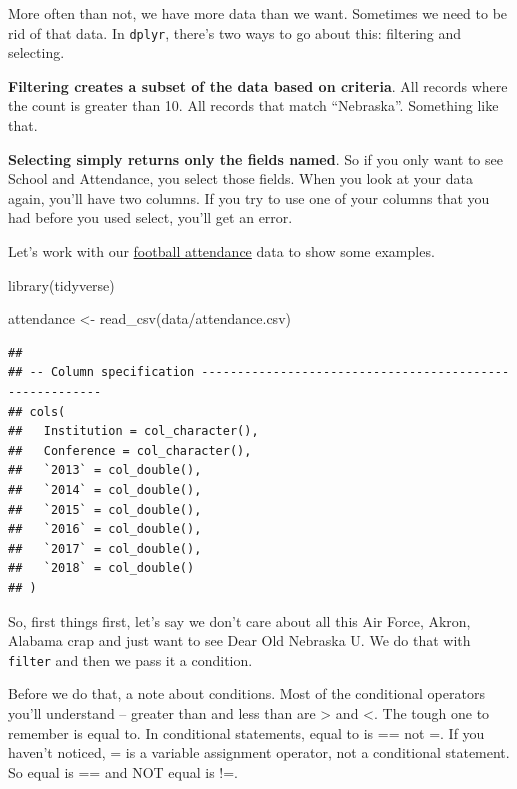 \documentclass[
]{book}
\newenvironment{Shaded}{\begin{snugshade}}{\end{snugshade}}
\newcommand{\FunctionTok}[1]{\textcolor[rgb]{0.00,0.00,0.00}{#1}}
\newcommand{\NormalTok}[1]{#1}
\newcommand{\OtherTok}[1]{\textcolor[rgb]{0.56,0.35,0.01}{#1}}
\newcommand{\StringTok}[1]{\textcolor[rgb]{0.31,0.60,0.02}{#1}}
\begin{document}
More often than not, we have more data than we want. Sometimes we need to be rid of that data. In \texttt{dplyr}, there's two ways to go about this: filtering and selecting.

\textbf{Filtering creates a subset of the data based on criteria}. All records where the count is greater than 10. All records that match ``Nebraska''. Something like that.

\textbf{Selecting simply returns only the fields named}. So if you only want to see School and Attendance, you select those fields. When you look at your data again, you'll have two columns. If you try to use one of your columns that you had before you used select, you'll get an error.

Let's work with our \href{https://unl.box.com/s/oajabnn5614s22jstgcd9ojxo2njn6jt}{football attendance} data to show some examples.

\begin{Shaded}
\begin{Highlighting}[]
\FunctionTok{library}\NormalTok{(tidyverse)}
\end{Highlighting}
\end{Shaded}

\begin{Shaded}
\begin{Highlighting}[]
\NormalTok{attendance }\OtherTok{\textless{}{-}} \FunctionTok{read\_csv}\NormalTok{(}\StringTok{\textquotesingle{}data/attendance.csv\textquotesingle{}}\NormalTok{)}
\end{Highlighting}
\end{Shaded}

\begin{verbatim}
## 
## -- Column specification --------------------------------------------------------
## cols(
##   Institution = col_character(),
##   Conference = col_character(),
##   `2013` = col_double(),
##   `2014` = col_double(),
##   `2015` = col_double(),
##   `2016` = col_double(),
##   `2017` = col_double(),
##   `2018` = col_double()
## )
\end{verbatim}

So, first things first, let's say we don't care about all this Air Force, Akron, Alabama crap and just want to see Dear Old Nebraska U. We do that with \texttt{filter} and then we pass it a condition.

Before we do that, a note about conditions. Most of the conditional operators you'll understand -- greater than and less than are \textgreater{} and \textless. The tough one to remember is equal to. In conditional statements, equal to is == not =. If you haven't noticed, = is a variable assignment operator, not a conditional statement. So equal is == and NOT equal is !=.
\end{document}
